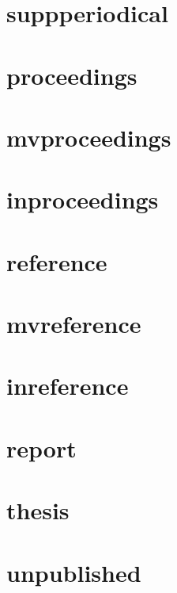 \documentclass{article}
\begin{document}
\cite[1]{periodical}

\cite[1]{periodical}

\section{suppperiodical}

\cite[1]{suppperiodical}

\cite[1]{suppperiodical}

\section{proceedings}

\cite[1]{proceedings}

\cite[1]{proceedings}

\section{mvproceedings}

\cite[1]{mvproceedings}

\cite[1]{mvproceedings}

\section{inproceedings}

\cite[1]{inproceedings}

\cite[1]{inproceedings}

\section{reference}

\cite[1]{reference}

\cite[1]{reference}

\section{mvreference}

\cite[1]{mvreference}

\cite[1]{mvreference}

\section{inreference}

\cite[1]{inreference}

\cite[1]{inreference}

\section{report}

\cite[1]{report}

\cite[1]{report}

\section{thesis}

\cite[1]{thesis}

\cite[1]{thesis}

\section{unpublished}

\cite[1]{unpublished}

\cite[1]{unpublished}


\printbibliography
\end{document}

